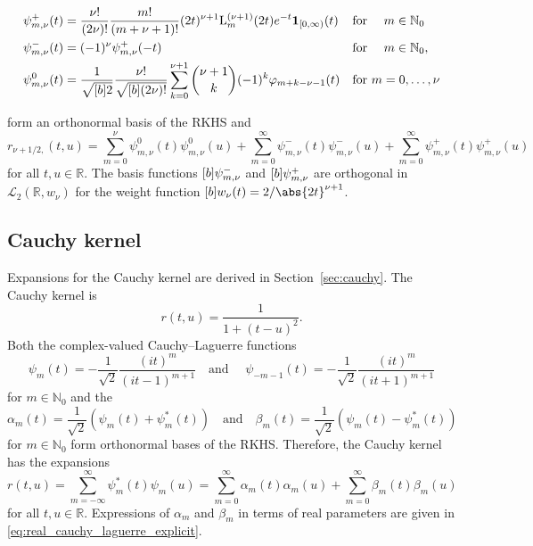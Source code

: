 \documentclass{article}
\newcommand{\tmcolor}[2]{{\color{#1}{#2}}}
\newcommand{\R}{\mathbb{R}}
\newcommand{\N}{\mathbb{N}}
\newcommand{\rev}[1]{\tmcolor{black}{#1}}
\begin{document}
\begin{align*}
  \psi^+_{m, \nu} (t) & = \frac{\nu !}{(2 \nu) !}  \frac{m!}{(m + \nu + 1) !} 
  (2 t)^{\nu + 1} \mathrm{L}_m^{(\nu + 1)} (2 t) e^{- t}  \textbf{1}_{[0,
  \infty)} (t) &  & \text{for } \quad m \in \mathbb{N}_0\\
  \psi^-_{m, \nu} (t) & = (- 1)^{\nu} \psi^+_{m, \nu}  (- t) &  & \text{for }
  \quad m \in \mathbb{N}_0,\\
  \psi^0_{m, \nu} (t) & = \frac{1}{\sqrt{\smash{[} b] 2}}  \frac{\nu
  !}{\sqrt{\smash{[} b] (2 \nu) !}}  \sum_{k = 0}^{\nu + 1} \binom{\nu + 1}{k}
  (- 1)^k \varphi_{m + k - \nu - 1} (t) &  & \text{for } m = 0, \ldots, \nu
\end{align*}

form an orthonormal basis of the RKHS and
\[ r_{\nu + 1 / 2,} (t, u) = \sum_{m = 0}^{\nu} \psi^0_{m, \nu} (t) \psi^0_{m,
   \nu} (u) + \sum_{m = 0}^{\infty} \psi^-_{m, \nu} (t) \psi^-_{m, \nu} (u) +
   \sum_{m = 0}^{\infty} \psi^+_{m, \nu} (t) \psi^+_{m, \nu} (u) \]
for all $t, u \in \R$. The basis functions $\smash{[} b] \psi_{m, \nu}^-$ and
$\smash{[} b] \psi_{m, \nu}^+$ are orthogonal in $\mathscr{L}_2 (\R, w_{\nu})$
for the weight function $\smash{[} b] w_{\nu} (t) = 2 / \abs{2 t}^{\nu + 1}$.

\subsection{Cauchy kernel}

Expansions for the Cauchy kernel are derived in  Section~\ref{sec:cauchy}. The
Cauchy kernel is
\[ r (t, u) = \frac{1}{1 + (t - u)^2} . \]
Both the complex-valued Cauchy--Laguerre functions
\[ \psi_m (t) = - \frac{1}{\sqrt{2}}  \frac{(it)^m}{(it - 1)^{m + 1}}  \quad
   \text{and } \quad \psi_{- m - 1} (t) = - \frac{1}{\sqrt{2}} 
   \frac{(it)^m}{(it + 1)^{m + 1}} \]
for $m \in \N_0$ and the {\rev{real-valued Cauchy--Laguerre functions}}
\[ \alpha_m (t) = \frac{1}{\sqrt{2}}  (\psi_m (t) + \psi_m^{\ast} (t))  \quad
   \text{and} \quad \beta_m (t) = \frac{1}{\sqrt{2}}  (\psi_m (t) -
   \psi_m^{\ast} (t)) \]
for $m \in \N_0$ form orthonormal bases of the RKHS. Therefore, the Cauchy
kernel has the expansions
\[ r (t, u) = \sum_{m = - \infty}^{\infty} \psi_m^{\ast} (t) \psi_m (u) =
   \sum_{m = 0}^{\infty} \alpha_m (t) \alpha_m (u) + \sum_{m = 0}^{\infty}
   \beta_m (t) \beta_m (u) \]
for all $t, u \in \R$. Expressions of $\alpha_m$ and $\beta_m$ in terms of
real parameters are given in \eqref{eq:real_cauchy_laguerre_explicit}.
\end{document}

